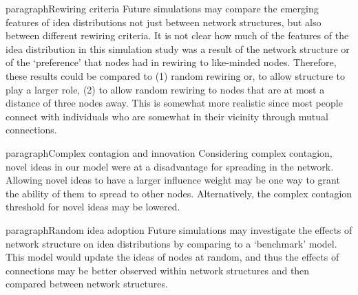 \documentclass{beamer}
\begin{document}
\begin{frame}
paragraph{Rewiring criteria}
Future simulations may compare the emerging features of idea distributions not just between network structures, but also between different rewiring criteria. It is not clear how much of the features of the idea distribution in this simulation study was a result of the network structure or of the `preference' that nodes had in rewiring to like-minded nodes. Therefore, these results could be compared to (1) random rewiring or, to allow structure to play a larger role, (2) to allow random rewiring to nodes that are at most a distance of three nodes away. This is somewhat more realistic since most people connect with individuals who are somewhat in their vicinity through mutual connections. 

paragraph{Complex contagion and innovation}
Considering complex contagion, novel ideas in our model were at a disadvantage for spreading in the network. Allowing novel ideas to have a larger influence weight may be one way to grant the ability of them to spread to other nodes. Alternatively, the complex contagion threshold for novel ideas may be lowered.

paragraph{Random idea adoption}
Future simulations may investigate the effects of network structure on idea distributions by comparing to a `benchmark' model. This model would update the ideas of nodes at random, and thus the effects of connections may be better observed within network structures and then compared between network structures.
\end{frame}
\end{document}
